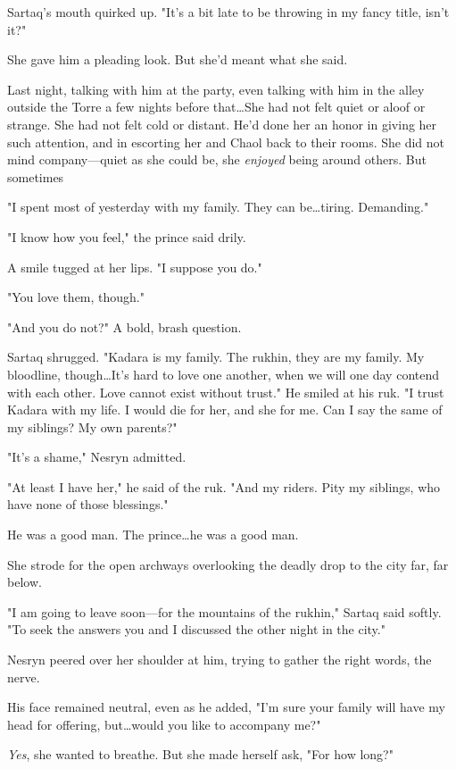 Sartaq's mouth quirked up.
"It's a bit late to be throwing in my fancy title, isn't it?"

She gave him a pleading look.
But she'd meant what she said.

Last night, talking with him at the party, even talking with him in the alley outside the Torre a few nights before that\ldots She had not felt quiet or aloof or strange.
She had not felt cold or distant.
He'd done her an honor in giving her such attention, and in escorting her and Chaol back to their rooms.
She did not mind company---quiet as she could be, she \emph{enjoyed} being around others.
But sometimes 

"I spent most of yesterday with my family.
They can be\ldots tiring.
Demanding."

"I know how you feel," the prince said drily.

A smile tugged at her lips.
"I suppose you do."

"You love them, though."

"And you do not?"
A bold, brash question.

Sartaq shrugged.
"Kadara is my family.
The rukhin, they are my family.
My bloodline, though\ldots It's hard to love one another, when we will one day contend with each other.
Love cannot exist without trust."
He smiled at his ruk.
"I trust Kadara with my life.
I would die for her, and she for me.
Can I say the same of my siblings?
My own parents?"

"It's a shame," Nesryn admitted.

"At least I have her," he said of the ruk.
"And my riders.
Pity my siblings, who have none of those blessings."

He was a good man.
The prince\ldots he was a good man.

She strode for the open archways overlooking the deadly drop to the city far, far below.

"I am going to leave soon---for the mountains of the rukhin," Sartaq said softly.
"To seek the answers you and I discussed the other night in the city."

Nesryn peered over her shoulder at him, trying to gather the right words, the nerve.

His face remained neutral, even as he added, "I'm sure your family will have my head for offering, but\ldots would you like to accompany me?"

\emph{Yes}, she wanted to breathe.
But she made herself ask, "For how long?"

